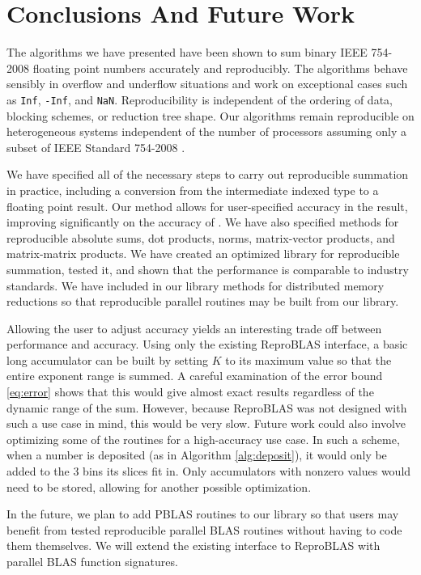 \section{Conclusions And Future Work}
  The algorithms we have presented have been shown to sum binary IEEE 754-2008 floating point numbers accurately and reproducibly. The algorithms behave sensibly in overflow and underflow situations and work on exceptional cases such as \texttt{Inf}, \texttt{-Inf}, and \texttt{NaN}. Reproducibility is independent of the ordering of data, blocking schemes, or reduction tree shape. Our algorithms remain reproducible on heterogeneous systems independent of the number of processors assuming only a subset of IEEE Standard 754-2008 \cite{ieee754}.

   We have specified all of the necessary steps to carry out reproducible summation in practice, including a conversion from the intermediate indexed type to a floating point result. Our method allows for user-specified accuracy in the result, improving significantly on the accuracy of \cite{repsum}. We have also specified methods for reproducible absolute sums, dot products, norms, matrix-vector products, and matrix-matrix products. We have created an optimized library for reproducible summation, tested it, and shown that the performance is comparable to industry standards. We have included in our library methods for distributed memory reductions so that reproducible parallel routines may be built from our library.

  Allowing the user to adjust accuracy yields an interesting trade off between performance and accuracy. Using only the existing ReproBLAS interface, a basic long accumulator can be built by setting $K$ to its maximum value so that the entire exponent range is summed. A careful examination of the error bound \eqref{eq:error} shows that this would give almost exact results regardless of the dynamic range of the sum. However, because ReproBLAS was not designed with such a use case in mind, this would be very slow. Future work could also involve optimizing some of the routines for a high-accuracy use case. In such a scheme, when a number is deposited (as in Algorithm \ref{alg:deposit}), it would only be added to the 3 bins its slices fit in. Only accumulators with nonzero values would need to be stored, allowing for another possible optimization.

  In the future, we plan to add PBLAS routines to our library so that users may benefit from tested reproducible parallel BLAS routines without having to code them themselves. We will extend the existing interface to ReproBLAS with parallel BLAS function signatures.
